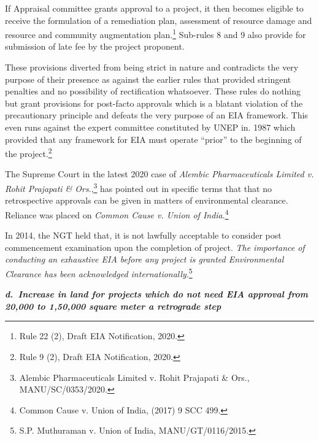 \begin{multicols}{2}
\noi
If Appraisal committee grants approval to a project, it then becomes eligible to receive the
formulation of a remediation plan, assessment of resource damage and resource and
community augmentation plan.\footnote{Rule 22 (2), Draft EIA Notification, 2020.} Sub-rules 8 and 9 also provide for submission of late fee by
the project proponent.

\vspace{-.05cm}

\noi
These provisions diverted from being strict in nature and contradicts the very purpose of their
presence as against the earlier rules that provided stringent penalties and no possibility of
rectification whatsoever. These rules do nothing but grant provisions for post-facto approvals
which is a blatant violation of the precautionary principle and defeats the very purpose of an
EIA framework. This even runs against the expert committee constituted by UNEP in. 1987
which provided that any framework for EIA must operate “prior” to the beginning of the
project.\footnote{Rule 9 (2), Draft EIA Notification, 2020.}

\vspace{-.05cm}

\noi
The Supreme Court in the latest 2020 case of \textit{Alembic Pharmaceuticals Limited v. Rohit
Prajapati \& Ors}.,\footnote{Alembic Pharmaceuticals Limited v. Rohit Prajapati \& Ors., MANU/SC/0353/2020.} has pointed out in specific terms that that no retrospective approvals can
be given in matters of environmental clearance. Reliance was placed on \textit{Common Cause v.
Union of India}.\footnote{Common Cause v. Union of India, (2017) 9 SCC 499.} 

\vspace{-.15cm}
\noi
In 2014, the NGT held that, it is not lawfully acceptable to consider post commencement
examination upon the completion of project. \textit{The importance of conducting an exhaustive EIA
before any project is granted Environmental Clearance has been acknowledged
internationally}.\footnote{S.P. Muthuraman v. Union of India, MANU/GT/0116/2015.}

\vspace{-.02cm}

\noi
{\large\it\bfseries d.~Increase in land for projects which do not need EIA approval from 20,000 to 1,50,000 square meter a retrograde step}

\vspace{-.05cm}


\end{multicols}
